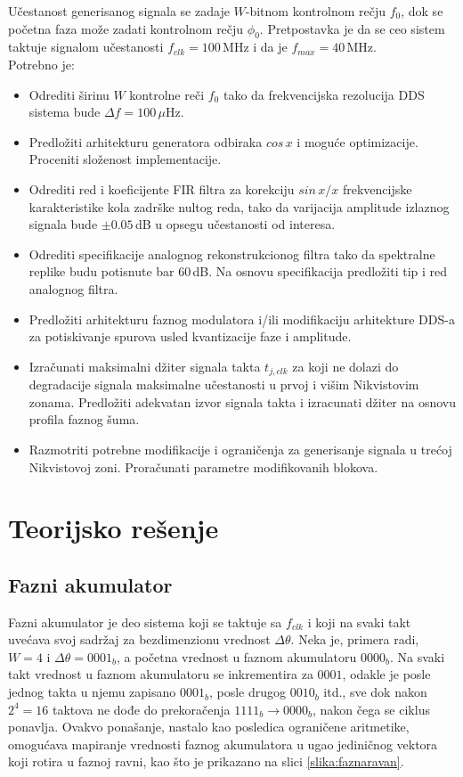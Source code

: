 \documentclass[conference]{IEEEtran}
\begin{document}
Učestanost generisanog signala se zadaje $W$-bitnom kontrolnom rečju $f_0$, dok se početna faza može zadati kontrolnom rečju $\phi_0$. Pretpostavka je da se ceo sistem taktuje signalom učestanosti $f_{clk} = 100$\,MHz i da je $f_{max} = 40$\,MHz. \\

Potrebno je:
\begin{itemize}
	\item Odrediti širinu $W$ kontrolne reči $f_0$ tako da frekvencijska rezolucija DDS sistema bude $\Delta f = 100\,\mu$Hz.
	\item Predložiti arhitekturu generatora odbiraka $cos\,x$ i moguće optimizacije. Proceniti složenost implementacije.
	\item Odrediti red i koeficijente FIR filtra za korekciju $sin\,x/x$ frekvencijske karakteristike kola zadrške nultog reda, tako da varijacija amplitude izlaznog signala bude $\pm 0.05$\,dB u opsegu učestanosti od interesa.
	\item Odrediti specifikacije analognog rekonstrukcionog filtra tako da spektralne replike budu potisnute bar $60$\,dB. Na osnovu specifikacija predložiti tip i red analognog filtra.
	\item Predložiti arhitekturu faznog modulatora i/ili modifikaciju arhitekture DDS-a za potiskivanje spurova usled kvantizacije faze i amplitude.
	\item Izračunati maksimalni džiter signala takta $t_{j,clk}$ za koji ne dolazi do degradacije signala maksimalne učestanosti u prvoj i višim Nikvistovim zonama. Predložiti adekvatan izvor signala takta i izracunati džiter na osnovu profila faznog šuma.
	\item Razmotriti potrebne modifikacije i ograničenja za generisanje signala u trećoj Nikvistovoj zoni. Proračunati parametre modifikovanih blokova.
\end{itemize}
\bigskip

\section{Teorijsko rešenje}\label{sekcija:teorija}
\subsection{Fazni akumulator}
Fazni akumulator je deo sistema koji se taktuje sa $f_{clk}$ i koji na svaki takt uvećava svoj sadržaj za bezdimenzionu vrednost $\Delta \theta$. Neka je, primera radi, $W=4$ i $\Delta \theta=0001_b$, a početna vrednost u faznom akumulatoru $0000_b$. Na svaki takt vrednost u faznom akumulatoru se inkrementira za $0001$, odakle je posle jednog takta u njemu zapisano $0001_b$, posle drugog $0010_b$ itd., sve dok nakon $2^4=16$ taktova ne dođe do prekoračenja $1111_b\rightarrow 0000_b$, nakon čega se ciklus ponavlja. Ovakvo ponašanje, nastalo kao posledica ograničene aritmetike, omogućava mapiranje vrednosti faznog akumulatora u ugao jediničnog vektora koji rotira u faznoj ravni, kao što je prikazano na slici \ref{slika:faznaravan}. 
\end{document}
